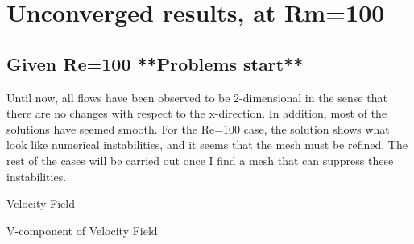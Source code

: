 \documentclass[11pt]{article}
\begin{document}
\section{Unconverged results, at Rm=100}
\subsection{Given Re=100 **Problems start**}
Until now, all flows have been observed to be 2-dimensional in the sense that there are no changes with respect to the x-direction. In addition, most of the solutions have seemed smooth. For the Re=100 case, the solution shows what look like numerical instabilities, and it seems that the mesh must be refined. The rest of the cases will be carried out once I find a mesh that can suppress these instabilities.

\FIG[H] \CE
	\caption[Optional ]{Velocity Field}
\EFIG

\FIG[H] \CE
	\caption[Optional ]{V-component of Velocity Field}
\EFIG



\end{document}
